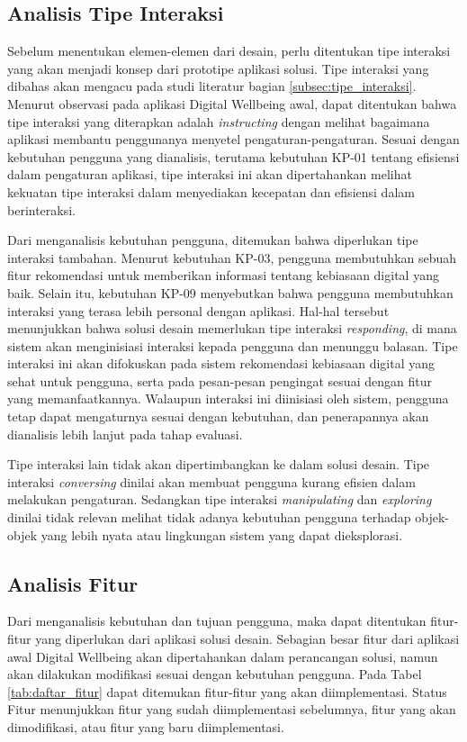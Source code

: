 \subsection{Analisis Tipe Interaksi}

Sebelum menentukan elemen-elemen dari desain, perlu ditentukan tipe interaksi yang akan menjadi konsep dari prototipe aplikasi solusi. Tipe interaksi yang dibahas akan mengacu pada studi literatur bagian \ref{subsec:tipe_interaksi}. Menurut observasi pada aplikasi Digital Wellbeing awal, dapat ditentukan bahwa tipe interaksi yang diterapkan adalah \textit{instructing} dengan melihat bagaimana aplikasi membantu penggunanya menyetel pengaturan-pengaturan. Sesuai dengan kebutuhan pengguna yang dianalisis, terutama kebutuhan KP-01 tentang efisiensi dalam pengaturan aplikasi, tipe interaksi ini akan dipertahankan melihat kekuatan tipe interaksi dalam menyediakan kecepatan dan efisiensi dalam berinteraksi.

Dari menganalisis kebutuhan pengguna, ditemukan bahwa diperlukan tipe interaksi tambahan. Menurut kebutuhan KP-03, pengguna membutuhkan sebuah fitur rekomendasi untuk memberikan informasi tentang kebiasaan digital yang baik. Selain itu, kebutuhan KP-09 menyebutkan bahwa pengguna membutuhkan interaksi yang terasa lebih personal dengan aplikasi. Hal-hal tersebut menunjukkan bahwa solusi desain memerlukan tipe interaksi \textit{responding}, di mana sistem akan menginisiasi interaksi kepada pengguna dan menunggu balasan. Tipe interaksi ini akan difokuskan pada sistem rekomendasi kebiasaan digital yang sehat untuk pengguna, serta pada pesan-pesan pengingat sesuai dengan fitur yang memanfaatkannya. Walaupun interaksi ini diinisiasi oleh sistem, pengguna tetap dapat mengaturnya sesuai dengan kebutuhan, dan penerapannya akan dianalisis lebih lanjut pada tahap evaluasi.

Tipe interaksi lain tidak akan dipertimbangkan ke dalam solusi desain. Tipe interaksi \textit{conversing} dinilai akan membuat pengguna kurang efisien dalam melakukan pengaturan. Sedangkan tipe interaksi \textit{manipulating} dan \textit{exploring} dinilai tidak relevan melihat tidak adanya kebutuhan pengguna terhadap objek-objek yang lebih nyata atau lingkungan sistem yang dapat dieksplorasi.

\subsection{Analisis Fitur}

Dari menganalisis kebutuhan dan tujuan pengguna, maka dapat ditentukan fitur-fitur yang diperlukan dari aplikasi solusi desain. Sebagian besar fitur dari aplikasi awal Digital Wellbeing akan dipertahankan dalam perancangan solusi, namun akan dilakukan modifikasi sesuai dengan kebutuhan pengguna. Pada Tabel \ref{tab:daftar_fitur} dapat ditemukan fitur-fitur yang akan diimplementasi. Status Fitur menunjukkan fitur yang sudah diimplementasi sebelumnya, fitur yang akan dimodifikasi, atau fitur yang baru diimplementasi.

